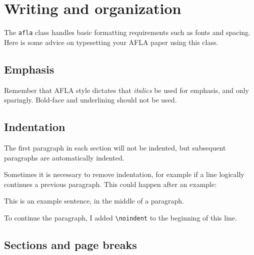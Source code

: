 \documentclass{afla}
\begin{document}
\makeatletter
\gdef\@authors\empty
\author{Michael Yoshitaka Erlewine\\
	McGill University\\
	michael.erlewine@mcgill.ca}
\author{Tobias Funke\\
	MIT Psycholinguistics\\
	funke@mit.edu}
{\@bspreauthor \@author \@bspostauthor}
\makeatother

\section{Writing and organization}

The \verb`afla` class handles basic formatting requirements such as fonts and spacing. Here is some advice on typesetting your AFLA paper using this class.

\subsection{Emphasis}

Remember that AFLA style dictates that \textit{italics} be used for emphasis, and only sparingly. Bold-face and underlining should not be used.

\subsection{Indentation}

The first paragraph in each section will not be indented, but subsequent paragraphs are automatically indented.

Sometimes it is necessary to remove indentation, for example if a line logically continues a previous paragraph. This could happen after an example:

\ex This is an example sentence, in the middle of a paragraph.
\xe
\

\noindent To continue the paragraph, I added \verb`\noindent` to the beginning of this line.

\subsection{Sections and page breaks}
\end{document}
